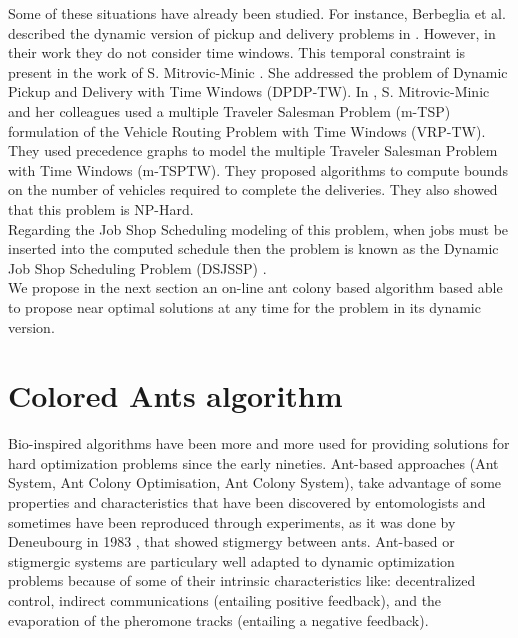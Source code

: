 \documentclass[a4paper,12pt]{article}
\begin{document}
Some of these situations have already been studied. For instance, Berbeglia et al. described the dynamic version of pickup and delivery problems in \cite{Berbeglia2010}. However, in their work they do not consider time windows. This temporal constraint is present in the work of S. Mitrovic-Minic \cite{Mitrovic2001}. She addressed the problem of Dynamic Pickup and Delivery with Time Windows (DPDP-TW). In \cite{Mitrovic2006}, S. Mitrovic-Minic and her colleagues used a multiple Traveler Salesman Problem (m-TSP) formulation of the Vehicle Routing Problem with Time Windows (VRP-TW). They used precedence graphs to model the multiple Traveler Salesman Problem with Time Windows (m-TSPTW). They proposed algorithms to compute bounds on the number of vehicles required to complete the deliveries. They also showed that this problem is NP-Hard.\\

Regarding the Job Shop Scheduling modeling of this problem, when jobs must be inserted into the computed schedule then the problem is known as the Dynamic Job Shop Scheduling Problem (DSJSSP) \cite{Ramasesh1990}. \\%


We propose in the next section an on-line ant colony based algorithm based able to propose near optimal solutions at any time for the problem in its dynamic version.

\section{Colored Ants algorithm}\label{sec:ants}

Bio-inspired algorithms have been more and more used for providing solutions for hard optimization problems since the early nineties\cite{Dorigo2006}. Ant-based approaches (Ant System, Ant Colony Optimisation, Ant Colony System), take advantage of some properties and characteristics that have been discovered by entomologists and sometimes have been reproduced through experiments, as it was done by Deneubourg in 1983 \cite{Deneubourg1983}, that showed stigmergy between ants. Ant-based or stigmergic systems are particulary well adapted to dynamic optimization problems because of some of their intrinsic characteristics like: decentralized control, indirect communications (entailing positive feedback), and the evaporation of the pheromone tracks (entailing a negative feedback).\\
\end{document}

